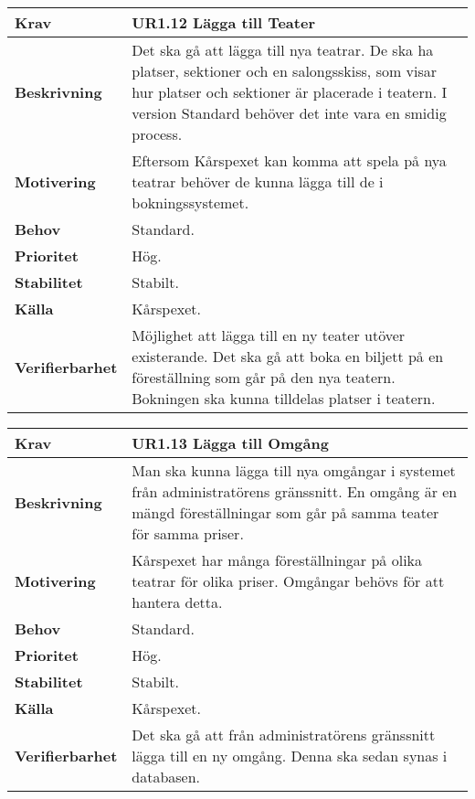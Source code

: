 \documentclass[a4paper, twoside, 11pt, titlepage]{article}
\begin{document}
		\begin{tabular} { p{2.6cm} p{12.5cm} }
			\hline
			\sffamily\textbf{Krav} & \sffamily\textbf{UR1.12 Lägga till Teater  } \\
			\hline
			\sffamily\textbf{Beskrivning} & Det ska gå att lägga till nya teatrar. De ska ha platser, sektioner och en salongsskiss, som visar hur platser och sektioner är placerade i teatern. I version Standard behöver det inte vara en smidig process.  \\
			\hline
			\sffamily\textbf{Motivering} & Eftersom Kårspexet kan komma att spela på nya teatrar behöver de kunna lägga till de i bokningssystemet.  \\
			\hline
			\sffamily\textbf{Behov} & Standard.  \\
			\hline
			\sffamily\textbf{Prioritet} & Hög.  \\
			\hline
			\sffamily\textbf{Stabilitet} & Stabilt.  \\
			\hline
			\sffamily\textbf{Källa} & Kårspexet.  \\
			\hline
			\sffamily\textbf{Verifierbarhet} & Möjlighet att lägga till en ny teater utöver existerande. Det ska gå att boka en biljett på en föreställning som går på den nya teatern. Bokningen ska kunna tilldelas platser i teatern.  \\
			\hline
		\end{tabular}
		\vspace{6mm}

		\begin{tabular} { p{2.6cm} p{12.5cm} }
			\hline
			\sffamily\textbf{Krav} & \sffamily\textbf{UR1.13 Lägga till Omgång  } \\
			\hline
			\sffamily\textbf{Beskrivning} & Man ska kunna lägga till nya omgångar i systemet från administratörens gränssnitt. En omgång är en mängd föreställningar som går på samma teater för samma priser.  \\
			\hline
			\sffamily\textbf{Motivering} & Kårspexet har många föreställningar på olika teatrar för olika priser. Omgångar behövs för att hantera detta.  \\
			\hline
			\sffamily\textbf{Behov} & Standard.  \\
			\hline
			\sffamily\textbf{Prioritet} & Hög.  \\
			\hline
			\sffamily\textbf{Stabilitet} & Stabilt.  \\
			\hline
			\sffamily\textbf{Källa} & Kårspexet.  \\
			\hline
			\sffamily\textbf{Verifierbarhet} & Det ska gå att från administratörens gränssnitt lägga till en ny omgång. Denna ska sedan synas i databasen.  \\
			\hline
		\end{tabular}
		\vspace{6mm}
\end{document}
